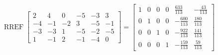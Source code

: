 \begin{exerciseAnswer} 


\[\operatorname{RREF} \left[\begin{array}{cccccc}
2 & 4 & 0 & -5 & -3 & 3 \\
-4 & -1 & -2 & 3 & -5 & -1 \\
-3 & -3 & 1 & -5 & -2 & -5 \\
1 & -1 & 2 & -1 & -4 & 0
\end{array}\right] = \left[\begin{array}{cccccc}
1 & 0 & 0 & 0 & \frac{633}{113} & -\frac{43}{113} \\
0 & 1 & 0 & 0 & -\frac{600}{113} & \frac{180}{113} \\
0 & 0 & 1 & 0 & -\frac{922}{113} & \frac{141}{113} \\
0 & 0 & 0 & 1 & -\frac{159}{113} & \frac{59}{113}
\end{array}\right] \]



\end{exerciseAnswer}
